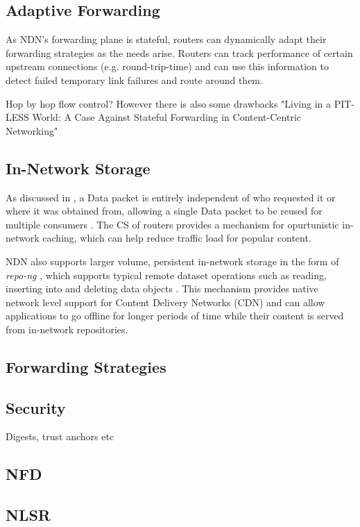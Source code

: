 \subsection*{Adaptive Forwarding}
As NDN's forwarding plane is stateful, routers can dynamically adapt their forwarding strategies as the needs arise. Routers can track performance of certain upstream connections (e.g. round-trip-time) and can use this information to detect failed temporary link failures and route around them.

Hop by hop flow control?
However there is also some drawbacks "Living in a PIT-LESS World: A Case Against
Stateful Forwarding in Content-Centric Networking"

\subsection{In-Network Storage}
As discussed in , a Data packet is entirely independent of who requested it or where it was obtained from, allowing a single Data packet to be reused for multiple consumers \cite{ndn}. The CS of routers provides a mechanism for opurtunistic in-network caching, which can help reduce traffic load for popular content. 

NDN also supports larger volume, persistent in-network storage in the form of \textit{repo-ng} \cite{ndn-repo}, which supports typical remote dataset operations such as reading, inserting into and deleting data objects \cite{ndn-repo-homepage}. This mechanism provides native network level support for Content Delivery Networks (CDN) \cite{ndn} and can allow applications to go offline for longer periods of 
time while their content is served from in-network repositories.

\subsection{Forwarding Strategies}

\subsection{Security}
Digests, trust anchors etc


\subsection{NFD}


\subsection{NLSR}\label{sec:NLSR}


